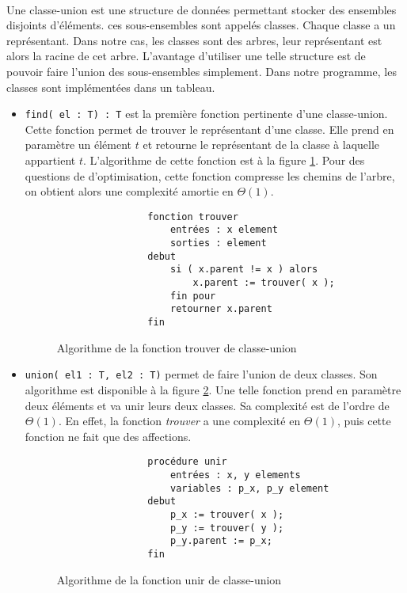 \documentclass[a4paper]{article}
\begin{document}
		    \paragraph{}{
		    Une classe-union est une structure de données permettant stocker des ensembles disjoints d'éléments. ces sous-ensembles sont 
		    appelés classes. Chaque classe a un représentant. Dans notre cas, les classes sont des arbres, leur représentant est alors
		    la racine de cet arbre. L'avantage d'utiliser une telle structure est de pouvoir faire l'union des
		    sous-ensembles simplement. Dans notre programme, les classes sont implémentées dans un tableau.
		    }
		    \begin{itemize}
			    \item \verb|find( el : T) : T| est la première fonction pertinente d'une classe-union. Cette fonction permet de trouver 
	    	le représentant d'une classe. Elle prend en paramètre un élément $t$ et retourne le représentant de la classe à
	    	laquelle appartient $t$.
	    	L'algorithme de cette fonction est à la figure \ref{algo_find}. Pour des questions de d'optimisation, cette fonction
	    	compresse les chemins de l'arbre, on obtient alors une complexité amortie en $\Theta(1)$.
	    	
	    	\begin{figure}
	    	    \begin{verbatim}
	    	    fonction trouver
	    	        entrées : x element
	    	        sorties : element
	    	    debut
	    	        si ( x.parent != x ) alors
	    	            x.parent := trouver( x );
	    	        fin pour
	    	        retourner x.parent
	    	    fin
	    	    \end{verbatim}
	    	\caption{Algorithme de la fonction trouver de classe-union \label{algo_find}}
	    	\end{figure}
	    	
	    	\item \verb|union( el1 : T, el2 : T)| permet de faire l'union de deux classes. Son algorithme est disponible à la 
	        figure \ref{algo_union}. Une telle fonction prend en paramètre deux éléments et va unir leurs deux classes.
	        Sa complexité est de l'ordre de $\Theta(1)$. En effet, la fonction \textit{trouver} a une complexité en $\Theta(1)$,
	        puis cette fonction ne fait que des affections.

	    	\begin{figure}
	    	    \begin{verbatim}
	    	    procédure unir
	    	        entrées : x, y elements
	    	        variables : p_x, p_y element
	    	    debut
	    	        p_x := trouver( x );
	    	        p_y := trouver( y );
	    	        p_y.parent := p_x;
	    	    fin
	    	    \end{verbatim}
	    	\caption{Algorithme de la fonction unir de classe-union \label{algo_union}}
	    	\end{figure}
	    	\end{itemize}
		
\end{document}

